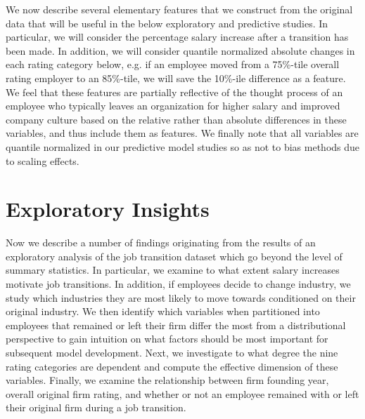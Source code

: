 \documentclass[10pt]{article}
\begin{document}
We now describe several elementary features that we construct from the original data that 
will be useful in the below exploratory and predictive studies.  In particular, we will 
consider the percentage salary increase after a transition has been made. 
In addition, we will consider quantile normalized absolute changes in each rating 
category below, e.g. if an employee moved from a 75\%-tile overall rating employer 
to an 85\%-tile, we will save the 10\%-ile difference as a feature.  We feel that these 
features are partially reflective of the thought process of an employee who typically leaves an organization 
for higher salary and improved company culture based on the relative rather than absolute 
differences in these variables, and thus include them as features.  We finally note that 
all variables are quantile normalized in our predictive model studies so as not to bias 
methods due to scaling effects.

\section{Exploratory Insights} \label{datstu}

Now we describe a number of findings originating from the results of an exploratory analysis of 
the job transition dataset which go beyond the level of summary statistics.  In particular, 
we examine to what extent salary increases motivate job transitions.  In addition, if employees decide to 
change industry, we study which industries they are most likely to move towards conditioned 
on their original industry.  We then 
identify which variables when partitioned into employees that remained or left their 
firm differ the most from a distributional perspective to gain intuition on what 
factors should be most important for subsequent model development.  Next, 
we investigate to what degree the nine rating categories are dependent and 
compute the effective dimension of these variables.  Finally, we examine the relationship 
between firm founding year, overall original firm rating, and whether or not an employee 
remained with or left their original firm during a job transition.
\end{document}
